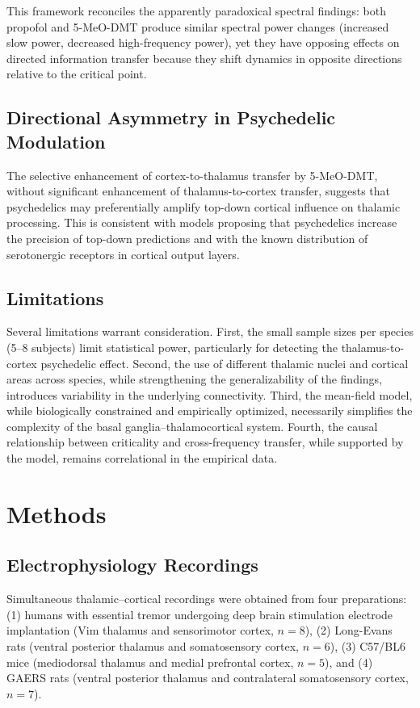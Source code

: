 \documentclass[11pt]{article}
\begin{document}
This framework reconciles the apparently paradoxical spectral findings: both propofol and 5-MeO-DMT produce similar spectral power changes (increased slow power, decreased high-frequency power), yet they have opposing effects on directed information transfer because they shift dynamics in opposite directions relative to the critical point.

\subsection{Directional Asymmetry in Psychedelic Modulation}

The selective enhancement of cortex-to-thalamus transfer by 5-MeO-DMT, without significant enhancement of thalamus-to-cortex transfer, suggests that psychedelics may preferentially amplify top-down cortical influence on thalamic processing. This is consistent with models proposing that psychedelics increase the precision of top-down predictions \citep{carhart2016neural} and with the known distribution of serotonergic receptors in cortical output layers.

\subsection{Limitations}

Several limitations warrant consideration. First, the small sample sizes per species (5--8 subjects) limit statistical power, particularly for detecting the thalamus-to-cortex psychedelic effect. Second, the use of different thalamic nuclei and cortical areas across species, while strengthening the generalizability of the findings, introduces variability in the underlying connectivity. Third, the mean-field model, while biologically constrained and empirically optimized, necessarily simplifies the complexity of the basal ganglia--thalamocortical system. Fourth, the causal relationship between criticality and cross-frequency transfer, while supported by the model, remains correlational in the empirical data.

\section{Methods}

\subsection{Electrophysiology Recordings}

Simultaneous thalamic--cortical recordings were obtained from four preparations: (1) humans with essential tremor undergoing deep brain stimulation electrode implantation (Vim thalamus and sensorimotor cortex, $n = 8$), (2) Long-Evans rats (ventral posterior thalamus and somatosensory cortex, $n = 6$), (3) C57/BL6 mice (mediodorsal thalamus and medial prefrontal cortex, $n = 5$), and (4) GAERS rats (ventral posterior thalamus and contralateral somatosensory cortex, $n = 7$).
\end{document}
